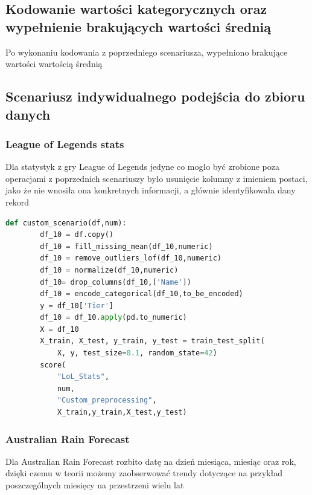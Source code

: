 \documentclass{article}
\begin{document}
\subsection{Kodowanie wartości kategorycznych oraz wypełnienie brakujących wartości średnią}
Po wykonaniu kodowania z poprzedniego scenariusza, wypełniono brakujące wartości wartością średnią
\subsection{Scenariusz indywidualnego podejścia do zbioru danych}
\subsubsection{League of Legends stats}
Dla statystyk z gry League of Legends jedyne co mogło być zrobione poza operacjami z poprzednich scenariuszy było usunięcie kolumny z imieniem postaci, 
jako że nie wnosiła ona konkretnych informacji, a głównie identyfikowała dany rekord

\begin{lstlisting}[language=Python, caption={Indywidualny scenariusz dla zestawu danych LoL Stats}, captionpos=b]
    def custom_scenario(df,num):
        df_10 = df.copy()
        df_10 = fill_missing_mean(df_10,numeric)
        df_10 = remove_outliers_lof(df_10,numeric)
        df_10 = normalize(df_10,numeric)
        df_10= drop_columns(df_10,['Name'])
        df_10 = encode_categorical(df_10,to_be_encoded)
        y = df_10['Tier']
        df_10 = df_10.apply(pd.to_numeric)
        X = df_10
        X_train, X_test, y_train, y_test = train_test_split(
            X, y, test_size=0.1, random_state=42)
        score(
            "LoL_Stats",
            num,
            "Custom_preprocessing",
            X_train,y_train,X_test,y_test)
\end{lstlisting}

\subsubsection{Australian Rain Forecast}
Dla Australian Rain Forecast rozbito datę na dzień miesiąca, miesiąc oraz rok, 
dzięki czemu w teorii możemy zaobserwować trendy dotyczące na przykład poszczególnych miesięcy na przestrzeni wielu lat
\end{document}
